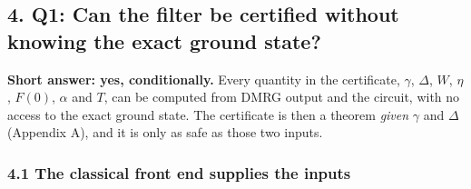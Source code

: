 \documentclass[
]{article}
\begin{document}
\hypertarget{q1-can-the-filter-be-certified-without-knowing-the-exact-ground-state}{%
\subsection{4. Q1: Can the filter be certified without knowing the exact
ground
state?}\label{q1-can-the-filter-be-certified-without-knowing-the-exact-ground-state}}

\textbf{Short answer: yes, conditionally.} Every quantity in the
certificate, \(\gamma\), \(\Delta\), \(W\), \(\eta\), \(F(0)\),
\(\alpha\) and \(T\), can be computed from DMRG output and the circuit,
with no access to the exact ground state. The certificate is then a
theorem \emph{given} \(\gamma\) and \(\Delta\) (Appendix A), and it is
only as safe as those two inputs.

\hypertarget{the-classical-front-end-supplies-the-inputs}{%
\subsubsection{4.1 The classical front end supplies the
inputs}\label{the-classical-front-end-supplies-the-inputs}}
\end{document}
